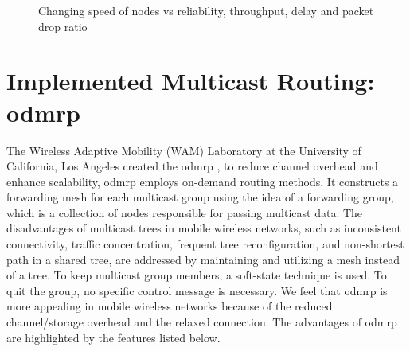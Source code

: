 \begin{figure}[!htbp]
    \caption{Changing speed of nodes vs reliability, throughput, delay and packet drop ratio}
    \label{fig:mobility-vs}
\end{figure}

\section{Implemented Multicast Routing: \acrshort{odmrp}}
The Wireless Adaptive Mobility (WAM) Laboratory at the University of California, Los Angeles created the \acrfull{odmrp} \cite{ODMRP}, to reduce channel overhead and enhance scalability, \acrshort{odmrp} employs on-demand routing methods.
It constructs a forwarding mesh for each multicast group using the idea of a forwarding group, which is a collection of nodes responsible for passing multicast data.
The disadvantages of multicast trees in mobile wireless networks, such as inconsistent connectivity, traffic concentration, frequent tree reconfiguration, and non-shortest path in a shared tree, are addressed by maintaining and utilizing a mesh instead of a tree.
To keep multicast group members, a soft-state technique is used.
To quit the group, no specific control message is necessary.
We feel that \acrshort{odmrp} is more appealing in mobile wireless networks because of the reduced channel/storage overhead and the relaxed connection.
The advantages of \acrshort{odmrp} are highlighted by the features listed below.

